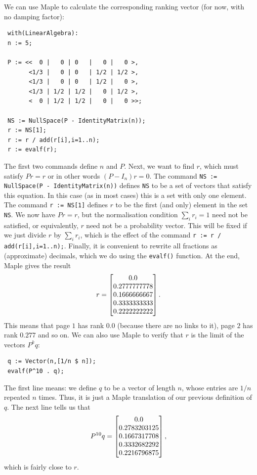 \documentclass[reqno]{amsart}
\theoremstyle{definition}
\begin{document}
We can use Maple to calculate the corresponding ranking vector
(for now, with no damping factor):
\begin{verbatim}
 with(LinearAlgebra):
 n := 5;

 P := <<  0 |   0 | 0   |   0 |   0 >,
       <1/3 |   0 | 0   | 1/2 | 1/2 >,
       <1/3 |   0 | 0   | 1/2 |   0 >,
       <1/3 | 1/2 | 1/2 |   0 | 1/2 >,
       <  0 | 1/2 | 1/2 |   0 |   0 >>;

 NS := NullSpace(P - IdentityMatrix(n));
 r := NS[1];
 r := r / add(r[i],i=1..n);
 r := evalf(r);
\end{verbatim}
The first two commands define $n$ and $P$.  Next, we want to find $r$,
which must satisfy $Pr=r$ or in other words $(P-I_n)r=0$.  The command 
\verb+NS := NullSpace(P - IdentityMatrix(n))+ defines \verb+NS+ 
to be a set of vectors that satisfy this equation.  In this case (as
in most cases) this is a set with only one element.  The command
\verb+r := NS[1]+ defines $r$ to be the first (and only) element in
the set \verb+NS+.  We now have $Pr=r$, but the normalisation
condition $\sum_ir_i=1$ need not be satisfied, or equivalently, $r$
need not be a probability vector.  This will be fixed if we just
divide $r$ by $\sum_ir_i$, which is the effect of the command 
\verb+r := r / add(r[i],i=1..n);+.  Finally, it is convenient to
rewrite all fractions as (approximate) decimals, which we do using the
\verb+evalf()+ function.  At the end, Maple gives the result
\[ r = \left[\begin{matrix}  0.0 \\
             0.2777777778 \\
             0.1666666667 \\
             0.3333333333 \\
             0.2222222222
       \end{matrix}\right].
\]
This means that page $1$ has rank $0.0$ (because there are no links to
it), page $2$ has rank $0.277$ and so on.  We can also use Maple to
verify that $r$ is the limit of the vectors $P^kq$:
\begin{verbatim}
 q := Vector(n,[1/n $ n]);
 evalf(P^10 . q);
\end{verbatim}
The first line means: we define $q$ to be a vector of length $n$,
whose entries are $1/n$ repeated $n$ times.  Thus, it is just a Maple
translation of our previous definition of $q$.  The next line tells us
that 
\[ P^{10} q = \left[\begin{matrix}
    0.0 \\
    0.2783203125 \\
    0.1667317708 \\
    0.3332682292 \\
    0.2216796875
   \end{matrix}\right],
\]
which is fairly close to $r$.
\end{document}
